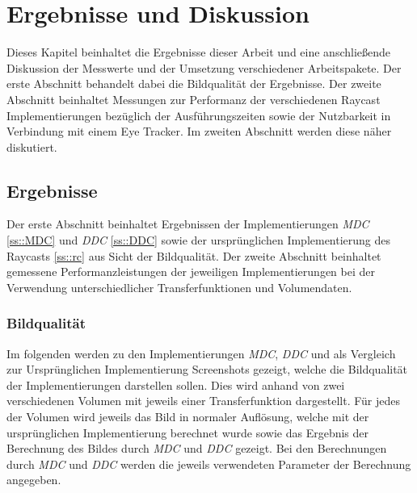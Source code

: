 \chapter{Ergebnisse und Diskussion}\label{chap::resdisc}
Dieses Kapitel beinhaltet die Ergebnisse dieser Arbeit und eine anschließende Diskussion der Messwerte und der Umsetzung verschiedener Arbeitspakete.
Der erste Abschnitt behandelt dabei die Bildqualität der Ergebnisse.
Der zweite Abschnitt beinhaltet Messungen zur Performanz der verschiedenen Raycast Implementierungen bezüglich der Ausführungszeiten sowie der Nutzbarkeit in Verbindung mit einem Eye Tracker.
Im zweiten Abschnitt werden diese näher diskutiert.

\section{Ergebnisse}\label{sec::results}
Der erste Abschnitt beinhaltet Ergebnissen der Implementierungen \emph{MDC} \ref{ss::MDC} und \emph{DDC} \ref{ss::DDC} sowie der ursprünglichen Implementierung des Raycasts \ref{ss::rc} aus Sicht der Bildqualität.
Der zweite Abschnitt beinhaltet gemessene Performanzleistungen der jeweiligen Implementierungen bei der Verwendung unterschiedlicher Transferfunktionen und Volumendaten.

\subsection{Bildqualität}
Im folgenden werden zu den Implementierungen \emph{MDC}, \emph{DDC} und als Vergleich zur Ursprünglichen Implementierung Screenshots gezeigt, welche die Bildqualität der Implementierungen darstellen sollen.
Dies wird anhand von zwei verschiedenen Volumen mit jeweils einer Transferfunktion dargestellt.
Für jedes der Volumen wird jeweils das Bild in normaler Auflösung, welche mit der ursprünglichen Implementierung berechnet wurde sowie das Ergebnis der Berechnung des Bildes durch \emph{MDC} und \emph{DDC} gezeigt.
Bei den Berechnungen durch \emph{MDC} und \emph{DDC} werden die jeweils verwendeten Parameter der Berechnung angegeben.

